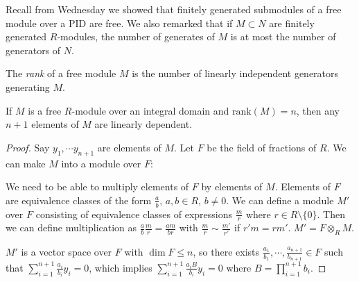 \documentclass[a4paper,twoside,master.tex]{subfiles}
\begin{document}

Recall from Wednesday we showed that finitely generated submodules of a free module over a PID are free. We also remarked that if $ M \subset N $ are finitely generated $ R $-modules, the number of generates of $ M $ is at most the number of generators of $ N $.
\begin{definition}
    The \textit{rank} of a free module $ M $ is the number of linearly independent generators generating $ M $. 
\end{definition}
\begin{claim}
    If $ M $ is a free $ R $-module over an integral domain and $ \text{rank}(M) = n $, then any $ n+1 $ elements of $ M $ are linearly dependent.
\end{claim}
\begin{proof}
    Say $ y_1, \cdots y_{n+1} $ are elements of $ M $. Let $ F $ be the field of fractions of $ R $. We can make $ M $ into a module over $ F $:

    We need to be able to multiply elements of $ F $ by elements of $ M $. Elements of $ F $ are equivalence classes of the form $ \frac{a}{b} $, $ a,b \in R $, $ b \neq 0 $. We can define a module $ M' $ over $ F $ consisting of equivalence classes of expressions $ \frac{m}{r} $ where $ r \in R\setminus\{0\} $. Then we can define multiplication as $ \frac{a}{b} \frac{m}{r} = \frac{am}{br} $ with $ \frac{m}{r} \sim \frac{m'}{r'} $ if $ r'm = rm' $. $ M' = F \otimes_R M $. 

    $ M' $ is a vector space over $ F $ with $ \dim F \leq n $, so there exists $ \frac{a_1}{b_1}, \cdots, \frac{a_{n+1}}{b_{n+1}} \in F $ such that $ \sum_{i=1}^{n+1} \frac{a_i}{b_i} y_i = 0 $, which implies $ \sum_{i=1}^{n+1} \frac{a_i B}{b_i} y_i = 0 $ where $ B = \prod_{i=1}^{n+1} b_i $.
\end{proof}
\end{document}
